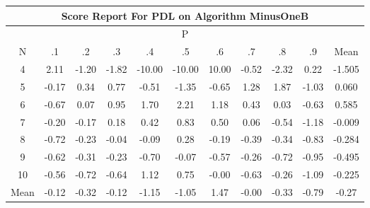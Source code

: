 \documentclass[11pt,a4paper]{report}
\begin{document}
\begin{longtable}{ | c || c | c | c | c | c | c | c | c | c || c |}
\hline
\multicolumn{11}{|c|}{ Score Report For PDL on Algorithm MinusOneB} \\
\hline
\multicolumn{11}{|c|}{ P } \\
\hline
N & .1 & .2 & .3 & .4 & .5 & .6 & .7 & .8 & .9 & Mean\\
 \hline
 \hline
 \endhead
  4 &  \cellcolor[HTML]{C7C7FF} 2.11 &  \cellcolor[HTML]{FFDFDF} -1.20 &  \cellcolor[HTML]{FFCFCF} -1.82 &  \cellcolor[HTML]{FF0000} -10.00 &  \cellcolor[HTML]{FF0000} -10.00 &  \cellcolor[HTML]{0808FF} 10.00 &  \cellcolor[HTML]{FFEFEF} -0.52 &  \cellcolor[HTML]{FFC7C7} -2.32 &  \cellcolor[HTML]{F7F7FF} 0.22 & -1.505 \\
  5 &  \cellcolor[HTML]{FFF7F7} -0.17 &  \cellcolor[HTML]{F7F7FF} 0.34 &  \cellcolor[HTML]{EFEFFF} 0.77 &  \cellcolor[HTML]{FFEFEF} -0.51 &  \cellcolor[HTML]{FFDFDF} -1.35 &  \cellcolor[HTML]{FFEFEF} -0.65 &  \cellcolor[HTML]{DFDFFF} 1.28 &  \cellcolor[HTML]{CFCFFF} 1.87 &  \cellcolor[HTML]{FFE7E7} -1.03 & 0.060 \\
  6 &  \cellcolor[HTML]{FFEFEF} -0.67 &  \cellcolor[HTML]{FFFFFF} 0.07 &  \cellcolor[HTML]{E7E7FF} 0.95 &  \cellcolor[HTML]{D7D7FF} 1.70 &  \cellcolor[HTML]{C7C7FF} 2.21 &  \cellcolor[HTML]{DFDFFF} 1.18 &  \cellcolor[HTML]{F7F7FF} 0.43 &  \cellcolor[HTML]{FFFFFF} 0.03 &  \cellcolor[HTML]{FFEFEF} -0.63 & 0.585 \\
  7 &  \cellcolor[HTML]{FFF7F7} -0.20 &  \cellcolor[HTML]{FFF7F7} -0.17 &  \cellcolor[HTML]{F7F7FF} 0.18 &  \cellcolor[HTML]{F7F7FF} 0.42 &  \cellcolor[HTML]{E7E7FF} 0.83 &  \cellcolor[HTML]{EFEFFF} 0.50 &  \cellcolor[HTML]{FFFFFF} 0.06 &  \cellcolor[HTML]{FFEFEF} -0.54 &  \cellcolor[HTML]{FFDFDF} -1.18 & -0.009 \\
  8 &  \cellcolor[HTML]{FFEFEF} -0.72 &  \cellcolor[HTML]{FFF7F7} -0.23 &  \cellcolor[HTML]{FFFFFF} -0.04 &  \cellcolor[HTML]{FFFFFF} -0.09 &  \cellcolor[HTML]{F7F7FF} 0.28 &  \cellcolor[HTML]{FFF7F7} -0.19 &  \cellcolor[HTML]{FFF7F7} -0.39 &  \cellcolor[HTML]{FFF7F7} -0.34 &  \cellcolor[HTML]{FFE7E7} -0.83 & -0.284 \\
  9 &  \cellcolor[HTML]{FFEFEF} -0.62 &  \cellcolor[HTML]{FFF7F7} -0.31 &  \cellcolor[HTML]{FFF7F7} -0.23 &  \cellcolor[HTML]{FFEFEF} -0.70 &  \cellcolor[HTML]{FFFFFF} -0.07 &  \cellcolor[HTML]{FFEFEF} -0.57 &  \cellcolor[HTML]{FFF7F7} -0.26 &  \cellcolor[HTML]{FFEFEF} -0.72 &  \cellcolor[HTML]{FFE7E7} -0.95 & -0.495 \\
  10 &  \cellcolor[HTML]{FFEFEF} -0.56 &  \cellcolor[HTML]{FFEFEF} -0.72 &  \cellcolor[HTML]{FFEFEF} -0.64 &  \cellcolor[HTML]{DFDFFF} 1.12 &  \cellcolor[HTML]{EFEFFF} 0.75 &  \cellcolor[HTML]{FFFFFF} -0.00 &  \cellcolor[HTML]{FFEFEF} -0.63 &  \cellcolor[HTML]{FFF7F7} -0.26 &  \cellcolor[HTML]{FFE7E7} -1.09 & -0.225 \\
 \hline
 \hline
Mean &  \cellcolor[HTML]{FFFFFF} -0.12 &  \cellcolor[HTML]{FFF7F7} -0.32 &  \cellcolor[HTML]{FFFFFF} -0.12 &  \cellcolor[HTML]{FFDFDF} -1.15 &  \cellcolor[HTML]{FFE7E7} -1.05 &  \cellcolor[HTML]{D7D7FF} 1.47 &  \cellcolor[HTML]{FFFFFF} -0.00 &  \cellcolor[HTML]{FFF7F7} -0.33 &  \cellcolor[HTML]{FFEFEF} -0.79 &  \cellcolor[HTML]{FFF7F7} -0.27
\end{longtable}
\end{document}
